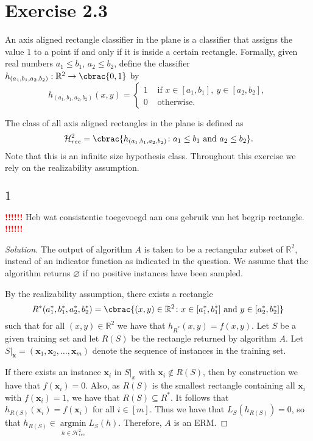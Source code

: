 \documentclass[10pt, a4paper, twoside]{amsart}
\newcommand{\R}{\ensuremath{\mathbb{R}}}
\DeclarePairedDelimiter\cbrac\{\}
\renewcommand{\c}{\ensuremath{\colon}}
\newcommand{\se}{\ensuremath{\subseteq}}
\newcommand{\argmin}{\operatorname*{argmin}}
\newenvironment{solution}
               {\let\oldqedsymbol=\qedsymbol
                \renewcommand{\qedsymbol}{$\blacktriangleleft$}
                \begin{proof}[Solution]}
               {\end{proof}
                \renewcommand{\qedsymbol}{\oldqedsymbol}}
\newcommand{\TODO}{\textcolor{red}{\textbf{!!!!!! }}}
\begin{document}
\section*{Exercise 2.3}
An axis aligned rectangle classifier in the plane is a classifier that assigns the value $1$ to a point 
if and only if it is inside a certain rectangle. 
Formally, given real numbers $a_1 \leq b_1$, $a_2 \leq b_2$, define the classifier $h_{(a_1, b_1, a_2, b_2)}:\R^2\to\cbrac{0,1}$ by
\begin{equation*}
h_{(a_1, b_1, a_2, b_2)}(x, y)=
\begin{cases}
 1 & \text{ if }x \in [a_1, b_1], \ y \in [a_2, b_2], \\
 0 & \text{ otherwise}.
\end{cases}
\end{equation*}

The class of all axis aligned rectangles in the plane is defined as
\begin{equation*}
\mathcal{H}^2_{rec}=\cbrac{h_{(a_1, b_1, a_2, b_2)} \c a_1 \leq b_1 \text{ and } a_2 \leq b_2}.
\end{equation*}
Note that this is an infinite size hypothesis class. Throughout this exercise we rely on the realizability assumption.

\subsection*{$1$}
\TODO Heb wat consistentie toegevoegd aan ons gebruik van het begrip rectangle.
\TODO


\begin{solution}
The output of algorithm $A$ is taken to be a rectangular subset of $\R^2$, 
instead of an indicator function as indicated in the question.
We assume that the algorithm returns $\varnothing$ if no positive instances have been sampled.

By the realizability assumption, there exists a rectangle 
\begin{equation*}
R^*(a_1^*,b_1^*,a_2^*,b_2^*)=\cbrac{(x,y)\in \R^2 \c x \in [a_1^*,b_1^*] \text{ and }y \in [a_2^*, b_2^*]}
\end{equation*}
such that for all $(x, y) \in \R^2$ we have that
$h_{R^*}(x, y)=f(x, y)$. Let $S$ be a given training set and let $R(S)$ be the rectangle returned by algorithm $A$. 
Let $S|_{\mathbf{x}}=(\mathbf{x}_1, \mathbf{x}_2, \ldots, \mathbf{x}_m)$ denote the sequence of instances in the training set.

If there exists an instance $\mathbf{x}_i$ in $S|_{x}$ with $\mathbf{x}_i \notin R(S)$, 
then by construction we have that $f(\mathbf{x}_i)=0$.
Also, as $R(S)$ is the smallest rectangle containing all $\mathbf{x}_i$ with $f(\mathbf{x}_i)=1$,
we have that $R(S)\se R^*$. It follows that $h_{R(S)}(\mathbf{x}_i)=f(\mathbf{x}_i)$ for all $i \in [m]$.
Thus we have that $L_S(h_{R(S)})=0$, so that $h_{R(S)} \in \argmin\limits_{h \in \mathcal{H}^2_{rec}}L_S(h)$.
Therefore, $A$ is an ERM.
\end{solution}
\end{document}
